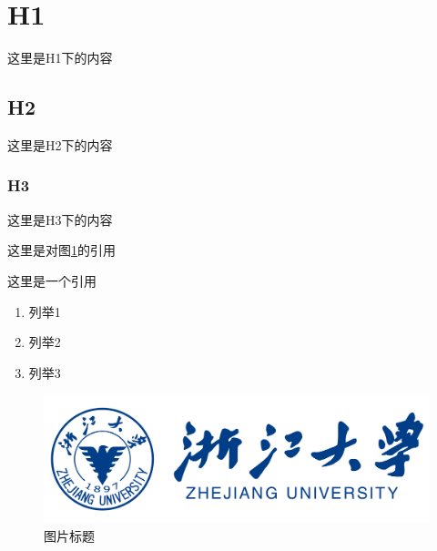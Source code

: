 \documentclass{article}
\begin{document}

\pagestyle{fancy}
\setcounter{page}{1}

\section{H1}

这里是H1下的内容

\subsection{H2}

这里是H2下的内容

\subsubsection{H3}

这里是H3下的内容

这里是对图\ref{fig:zju}的引用

这里是一个引用\cite{崔迪2017面向可视化系统设计与开发的嵌套增量模型}

\begin{enumerate}
    \item 列举1
    \item 列举2
    \item 列举3
\end{enumerate}

\begin{figure}
    \centering
    \includegraphics[scale=0.5]{assets/zju_logo.png}
    \caption{图片标题}
    \label{fig:zju}
\end{figure}


\clearpage

\nocite{梅鸿辉2016一种全球尺度三维大气数据可视化系统}
\printbibliography
\end{document}
